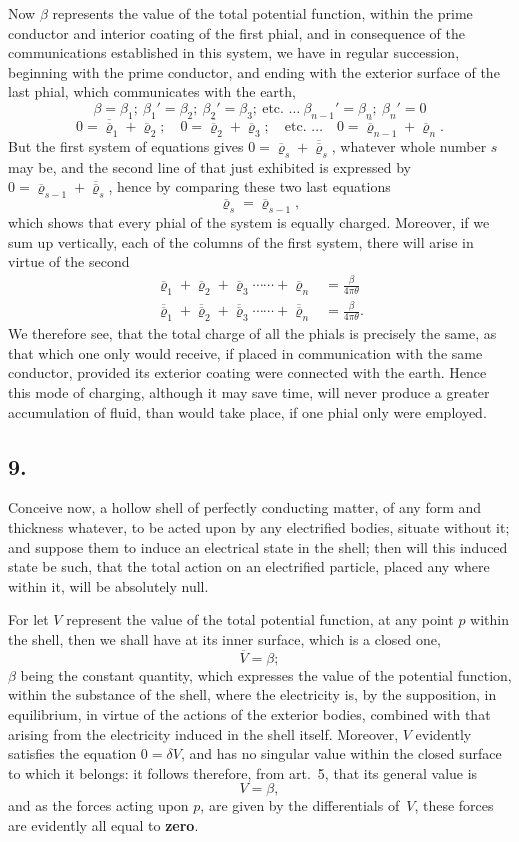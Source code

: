 \documentclass[12pt,notitlepage]{amsart}
\let\Emphasis\textbf
\newcommand\Section[1]{\subsection{{#1}}}
\renewcommand{\rho}{\varrho}
\begin{document}
Now $\beta$ represents the value of the total potential function, within the
prime conductor and interior coating of the first phial, and in consequence of
the communications established in this system, we have in regular succession,
beginning with the prime conductor, and ending with the exterior surface of
the last phial, which communicates with the earth,
\[
\beta=\beta_1;
\ \beta_1'=\beta_2;
\ \beta_2'=\beta_3;
\ \text{etc.\ \ldots}
\ \beta_{n-1}'=\beta_n;
\ \beta_n'=0
\]
\[
0=\overline{\overline\rho}_1+\overline\rho_2;
\quad 0=\overline{\overline\rho}_2+\overline\rho_3;
\quad\text{etc.\ \ldots}
\quad 0=\overline{\overline\rho}_{n-1}+\overline\rho_n.
\]
But the first system of equations gives
$0=\overline\rho_s+\overline{\overline\rho}_s$,
whatever whole number $s$
may be, and the second line of that just exhibited is expressed by
$0=\overline\rho_{s-1}+\overline{\overline\rho}_s$,
hence by comparing these two last equations
\[
\overline\rho_s=\overline\rho_{s-1},
\]
which shows that every phial of the system is equally charged. Moreover,
if we sum up vertically, each of the columns of the first system, there will
arise in virtue of the second
\[
\begin{aligned}
\overline\rho_1+\overline\rho_2+\overline\rho_3\cdots\cdots
+\overline\rho_n
&=\frac{\beta}{4\pi\theta}\\
\overline{\overline\rho}_1+\overline{\overline\rho}_2
+\overline{\overline\rho}_3\cdots\cdots
+\overline{\overline\rho}_n
&=\frac{\beta}{4\pi\theta}.
\end{aligned}
\]
We therefore see, that the total charge of all the phials is precisely
the same, as that which one only would receive, if placed in communication
with the same conductor, provided its exterior coating were connected with
the earth. Hence this mode of charging, although it may save time, will
never produce a greater accumulation of fluid, than would take place, if one
phial only were employed.
\bigskip

\Section{9.}
Conceive now, a hollow shell of perfectly conducting matter, of any
form and thickness whatever, to be acted upon by any electrified bodies,
situate without it; and suppose them to induce an electrical state in the shell;
then will this induced state be such, that the total action on an electrified
particle, placed any where within it, will be absolutely null.

For let $V$ represent the value of the total potential function, at any
point $p$ within the shell, then we shall have at its inner surface, which is a
closed one,
\[
\overline{V}=\beta;
\]
$\beta$ being the constant quantity, which expresses the value of the potential
function, within the substance of the shell, where the electricity is, by the
supposition, in equilibrium, in virtue of the actions of the exterior bodies,
combined with that arising from the electricity induced in the shell itself.
Moreover, $V$ evidently satisfies the equation $0=\delta V$,
and has no singular
value within the closed surface to which it belongs: it follows therefore, from
art.~5, that its general value is
\[
V=\beta,
\]
and as the forces acting upon $p$, are given by the differentials of~$V$, these
forces are evidently all equal to \Emphasis{zero}.
\end{document}
